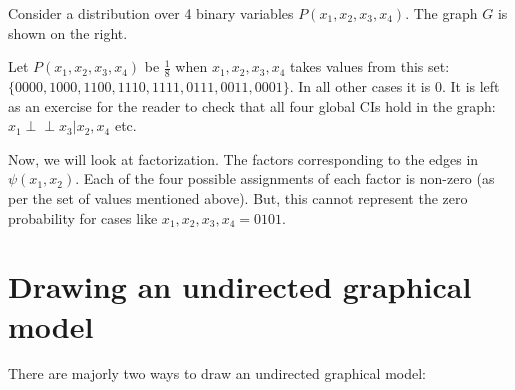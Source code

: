 \documentclass[a4paper,12pt]{article}
\begin{document}
\begin{minipage}{0.60\textwidth} 
    Consider a distribution over 4 binary variables $P(x_1, x_2, x_3, x_4)$. The graph $G$ is shown on the right. 

    Let $P(x_1, x_2, x_3, x_4)$ be $\frac{1}{8}$ when $x_1, x_2, x_3, x_4$ takes values from this set: $\{0000, 1000, 1100, 1110, 1111, 0111, 0011, 0001\}$. In all other cases it is 0. It is left as an exercise for the reader to check that all four global CIs hold in the graph: $x_1 \perp\!\!\!\perp x_3 | x_2, x_4$ etc.

    Now, we will look at factorization. The factors corresponding to the edges in $\psi(x_1, x_2)$. Each of the four possible assignments of each factor is non-zero (as per the set of values mentioned above). But, this cannot represent the zero probability for cases like $x_1, x_2, x_3, x_4 = 0101$.
\end{minipage}
\hfill 
\begin{minipage}{0.30\textwidth} 
\end{minipage}


\section{Drawing an undirected graphical model}
There are majorly two ways to draw an undirected graphical model:
\end{document}
